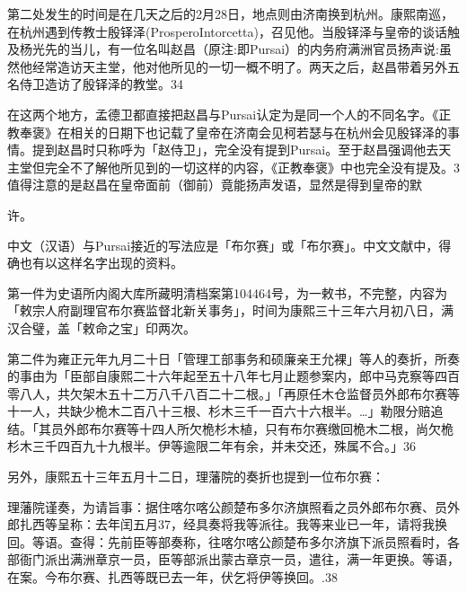 第二处发生的时间是在几天之后的2月28日，地点则由济南换到杭州。康熙南巡，在杭州遇到传教士殷铎泽(ProsperoIntorcetta)，召见他。当殷铎泽与皇帝的谈话触及杨光先的当儿，有一位名叫赵昌（原注:即Pursai）的内务府满洲官员扬声说:虽然他经常造访天主堂，他对他所见的一切一概不明了。两天之后，赵昌带着另外五名侍卫造访了殷铎泽的教堂。34

在这两个地方，孟德卫都直接把赵昌与Pursai认定为是同一个人的不同名字。《正教奉褒》在相关的日期下也记载了皇帝在济南会见柯若瑟与在杭州会见殷铎泽的事情。提到赵昌时只称呼为「赵侍卫」，完全没有提到Pursai。至于赵昌强调他去天主堂但完全不了解他所见到的一切这样的内容，《正教奉褒》中也完全没有提及。3值得注意的是赵昌在皇帝面前（御前）竟能扬声发语，显然是得到皇帝的默

\vfill
\begin{BookNotes}
\end{BookNotes}

\noindent 许。

中文（汉语）与Pursai接近的写法应是「布尔赛」或「布尔赛」。中文文献中，得确也有以这样名字出现的资料。

第一件为史语所内阁大库所藏明清档案第104464号，为一敕书，不完整，内容为「敕宗人府副理官布尔赛监督北新关事务」，时间为康熙三十三年六月初八日，满汉合璧，盖「敕命之宝」印两次。

第二件为雍正元年九月二十日「管理工部事务和硕廉亲王允裸」等人的奏折，所奏的事由为「臣部自康熙二十六年起至五十八年七月止题参案内，郎中马克察等四百零八人，共欠架木五十二万八千八百二十二根。」「再原任木仓监督员外郎布尔赛等十一人，共缺少桅木二百八十三根、杉木三千一百六十六根半。…」勒限分赔追结。「其员外郎布尔赛等十四人所欠桅杉木植，只有布尔赛缴回桅木二根，尚欠桅杉木三千四百九十九根半。伊等逾限二年有余，并未交还，殊属不合。」36

另外，康熙五十三年五月十二日，理藩院的奏折也提到一位布尔赛：

\begin{BookQuote}
理藩院谨奏，为请旨事：据住喀尔喀公颜楚布多尔济旗照看之员外郎布尔赛、员外郎扎西等呈称：去年闰五月37，经具奏将我等派往。我等来业已一年，请将我换回。等语。查得：先前臣等部奏称，往喀尔喀公颜楚布多尔济旗下派员照看时，各部衙门派出满洲章京一员，臣等部派出蒙古章京一员，遣往，满一年更换。等语，在案。今布尔赛、扎西等既已去一年，伏乞将伊等换回。.38
\end{BookQuote}

